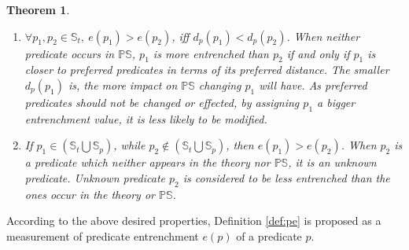 \documentclass[11pt,letterpaper]{article}
\newtheorem{theorem}{Theorem}[section]
\newcommand{\ps}{\mathbb{PS}}
\begin{document}
\begin{theorem}
\begin{enumerate}
\item $\forall p_{1},p_{2}  \in \mathbb{S}_{t},\ e(p_{1}) > e(p_{2})$, iff $d_{p}(p_{1}) < d_{p}(p_{2})$.\newline
\textnormal{When neither predicate occurs in $\ps$, $p_{1}$  is more entrenched than $p_{2}$  if and only if $p_{1}$ is closer to preferred predicates in terms of its preferred distance. The smaller $d_{p}(p_{1})$ is, the more impact on $\ps$ changing  $p_{1}$ will have. As preferred  predicates should not be changed or effected, by assigning $p_{1}$  a bigger entrenchment value, it is less likely to be modified. }
\item If $p_{1} \in (\mathbb{S}_{t} \bigcup \mathbb{S}_{p})$, while $p_{2} \not\in (\mathbb{S}_{t} \bigcup \mathbb{S}_{p})$, then $ e(p_{1}) > e(p_{2})$.\newline
\textnormal{When $p_{2}$ is a predicate which neither appears in the theory nor $\ps$, it is an \emph{unknown predicate}. Unknown predicate $p_{2}$ is considered to be less entrenched than the ones occur in the theory or $\ps$.}
\end{enumerate}
\end{theorem}

According to the above desired properties, Definition \ref{def:pe} is proposed as a measurement of predicate entrenchment $e(p)$ of a predicate $p$.
\end{document}
